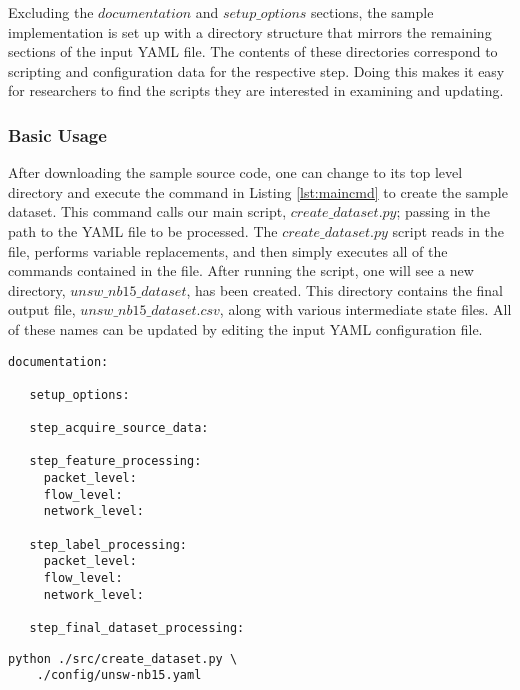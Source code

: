 \documentclass[sigconf, anonymous, screen, review]{acmart}
\begin{document}
Excluding the $documentation$ and $setup\_options$ sections, the sample implementation is set up with a directory structure that mirrors the remaining sections of the input YAML file.
The contents of these directories correspond to scripting and configuration data for the respective step.
Doing this makes it easy for researchers to find the scripts they are interested in examining and updating.

\subsubsection{Basic Usage}\label{subsubsec:basic_usage}
After downloading the sample source code, one can change to its top level directory and execute the command in Listing \ref{lst:maincmd} to create the sample dataset.
This command calls our main script, $create\_dataset.py$; passing in the path to the YAML file to be processed.
The $create\_dataset.py$ script reads in the file, performs variable replacements, and then simply executes all of the commands contained  in the file.
After running the script, one will see a new directory, $unsw\_nb15\_dataset$, has been created.
This directory contains the final output file, $unsw\_nb15\_dataset.csv$, along with various intermediate state files.
All of these names can be updated by editing the input YAML configuration file.

\noindent\begin{minipage}{\linewidth}
\begin{lstlisting}[aboveskip=10pt, label=lst:yamltemplate, caption={A template input file for our sample guidelines implementation.  Each section would be filled in with either information or explicit commands that get run to generate a feature set from network source data.}, captionpos=b, basicstyle=\footnotesize, backgroundcolor=\color{gray!10!white}, frame=stb]
   documentation:
   
   setup_options:
   
   step_acquire_source_data:
   
   step_feature_processing:
     packet_level:
     flow_level:
     network_level:
   
   step_label_processing:
     packet_level:
     flow_level:
     network_level:
   
   step_final_dataset_processing:
\end{lstlisting}
\end{minipage}


\begin{lstlisting}[label=lst:maincmd, caption={The command to run to execute the sample implementation of the guidelines.}, captionpos=b, basicstyle=\footnotesize, backgroundcolor=\color{gray!10!white}, frame=stb, breaklines=True]
python ./src/create_dataset.py \
    ./config/unsw-nb15.yaml
\end{lstlisting}
\end{document}
